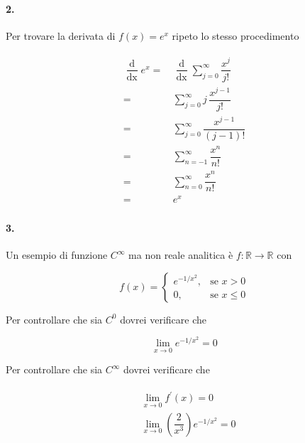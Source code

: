 \paragraph{2.}

Per trovare la derivata di $ f(x) = e^{x} $ ripeto lo stesso procedimento

\begin{align}
	\begin{split}
		\dfrac{\operatorname{d}}{\operatorname{dx}} e^{x} =& \, \dfrac{\operatorname{d}}{\operatorname{dx}} \sum_{j=0}^{\infty}\dfrac{x^{j}}{j!}\\
		=& \, \sum_{j=0}^{\infty} j \, \dfrac{x^{j-1}}{j!}\\
		=& \, \sum_{j=0}^{\infty} \dfrac{x^{j-1}}{(j-1)!}\\
		=& \, \sum_{n=-1}^{\infty} \dfrac{x^{n}}{n!}\\
		=& \, \sum_{n=0}^{\infty} \dfrac{x^{n}}{n!}\\
		=& \, e^{x}
	\end{split}
\end{align}

\paragraph{3.}

Un esempio di funzione $ C^{\infty} $ ma non reale analitica è $ f : \mathbb{R} \to \mathbb{R} $ con

\begin{equation}
	f(x) = \begin{cases}
		e^{-1/x^{2}},& \text{se } x > 0\\
		0,& \text{se } x \leqslant 0
	\end{cases}
\end{equation}

Per controllare che sia $ C^{0} $ dovrei verificare che

\begin{equation}
	\lim_{x \to 0} e^{-1/x^{2}} = 0
\end{equation}

Per controllare che sia $ C^{\infty} $ dovrei verificare che

\begin{align}
	\begin{split}
		&\lim_{x \to 0} f^{\prime} (x) = 0\\
		&\lim_{x \to 0} \left(\dfrac{2}{x^{3}}\right) e^{-1/x^{2}} = 0
	\end{split}
\end{align}

